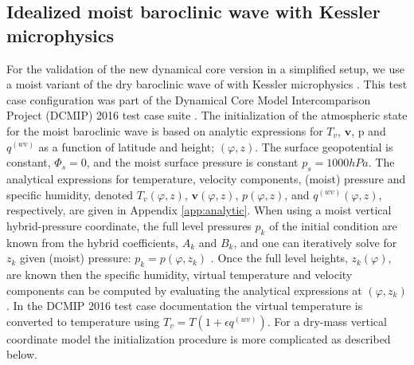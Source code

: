 \documentclass{agujournal}
\begin{document}
\subsection{Idealized moist baroclinic wave with Kessler microphysics}
For the validation of the new dynamical core version in a simplified setup, we use a moist variant of the dry baroclinic wave of \citet{UMJS2014QJRMS} with Kessler microphysics \citep{K1969MM}. This test case configuration was part of the Dynamical Core Model Intercomparison Project (DCMIP) 2016 test case suite \citep[][]{DCMIP16}. The initialization of the atmospheric state for the moist baroclinic wave is based on analytic expressions for $T_v$, $\mathbf{v}$, p and $q^{(wv)}$ as a function of latitude and height; $(\varphi,z)$. The surface geopotential is constant, $\Phi_s=0$, and the moist surface pressure is constant $p_s=1000hPa$. The analytical expressions for temperature, velocity components, (moist) pressure and specific humidity, denoted ${T_v}(\varphi,z)$, ${\mathbf{v}}(\varphi,z)$, ${p}(\varphi,z)$, and $q^{(wv)}(\varphi,z)$, respectively, are given in Appendix \ref{app:analytic}. When using a moist vertical hybrid-pressure coordinate, the full level pressures $p_k$ of the initial condition are known from the hybrid coefficients, $A_k$ and $B_k$, and one can iteratively solve for $z_k$ given (moist) pressure: $p_k={p}(\varphi,z_k)$ \citep[see, ][]{UMJS2014QJRMS}. Once the full level heights, $z_k(\varphi)$, are known then the specific humidity, virtual temperature and velocity components can be computed by evaluating the analytical expressions at $(\varphi,z_k)$. In the DCMIP 2016 test case documentation the virtual temperature is converted to temperature using $T_v=T\left( 1+\epsilon q^{(wv)}\right)$. For a dry-mass vertical coordinate model the initialization procedure is more complicated as described below.
\end{document}
